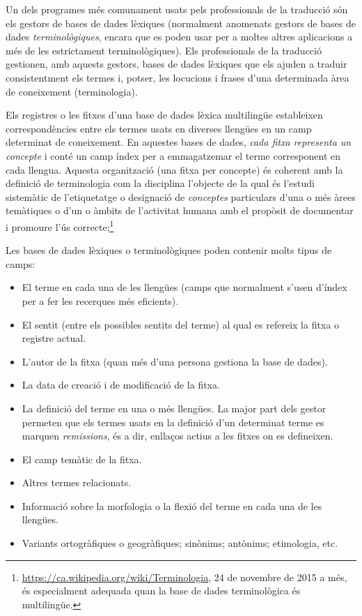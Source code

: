 Un dels programes més comunament usats pels professionals de la
traducció són els gestors de bases de dades lèxiques (normalment
anomenats gestors de bases de dades \emph{terminològiques}, encara que
es poden usar per a moltes altres aplicacions a més de les
estrictament terminològiques). Els professionals de la traducció
gestionen, amb aquests gestors, bases de dades lèxiques que els ajuden
a traduir consistentment els termes i, potser, les locucions i frases
d'una determinada àrea de coneixement (terminologia). 

Els registres o les fitxes d'una base de dades lèxica multilingüe
estableixen correspondències entre els termes usats en diverses
llengües en un camp determinat de coneixement. En aquestes bases de
dades, \emph{cada fitxa representa un concepte} i conté un camp índex
per a emmagatzemar el terme corresponent en cada llengua. Aquesta
organització (una fitxa per concepte) és coherent amb la definició de
terminologia com la disciplina l'objecte de la qual és l'estudi
sistemàtic de l'etiquetatge o designació de \emph{conceptes}
particulars d'una o més àrees temàtiques o d'un o àmbits de
l'activitat humana amb el propòsit de documentar i promoure l'ús
correcte;\footnote{\url{https://ca.wikipedia.org/wiki/Terminologia},
  24 de novembre de 2015 a més, és especialment adequada quan la base
  de dades terminològica és multilingüe.}

Les bases de dades lèxiques o terminològiques poden contenir molts
tipus de camps:
\begin{itemize}
\item El terme en cada una de les llengües (camps que normalment s'usen
  d'índex per a fer les recerques més eficients).
\item El sentit (entre els possibles sentits del terme) al qual es
  refereix la fitxa o registre actual.
\item L'autor de la fitxa (quan més d'una persona gestiona la base de
  dades).
\item La data de creació i de modificació de la fitxa.
\item La definició del terme en una o més llengües. La major part dels
  gestor permeten que els termes usats en la definició d'un determinat
  terme es marquen \emph{remissions}, és a dir, enllaços actius a les
  fitxes on es defineixen. 
\item El camp temàtic de la fitxa.
\item Altres termes relacionats.
\item Informació sobre la morfologia o la flexió del terme en cada una
  de les llengües.
\item 
    Variants ortogràfiques o geogràfiques; sinònims; antònims;
    etimologia, etc. 
  
\end{itemize}

